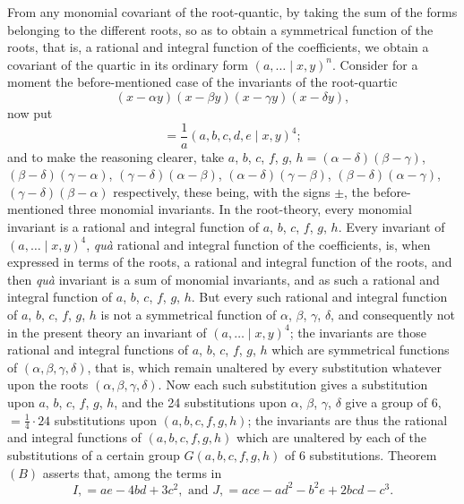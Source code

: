 \documentclass[11pt,a4paper]{book}
\begin{document}
From any monomial covariant of the root-quantic, by taking the sum of the forms belonging to the different roots, so as to obtain a symmetrical function of the roots, that is, a rational and integral function of the coefficients, we obtain a covariant of the quartic in its ordinary form $(a, \ldots \mid x, y)^n$. Consider for a moment the before-mentioned case of the invariants of the root-quartic
\[
(x - \alpha y)(x - \beta y)(x - \gamma y)(x - \delta y),
\]
now put
\[
= \frac{1}{a}(a, b, c, d, e \mid x, y)^4;
\]
and to make the reasoning clearer, take $a$, $b$, $c$, $f$, $g$, $h = (\alpha - \delta)(\beta - \gamma)$, $(\beta - \delta)(\gamma - \alpha)$, $(\gamma - \delta)(\alpha - \beta)$, $(\alpha - \delta)(\gamma - \beta)$, $(\beta - \delta)(\alpha - \gamma)$, $(\gamma - \delta)(\beta - \alpha)$ respectively, these being, with the signs $\pm$, the before-mentioned three monomial invariants. In the root-theory, every monomial invariant is a rational and integral function of $a$, $b$, $c$, $f$, $g$, $h$. Every invariant of $(a, \ldots \mid x, y)^4$, \textit{qu\`{a}} rational and integral function of the coefficients, is, when expressed in terms of the roots, a rational and integral function of the roots, and then \textit{qu\`{a}} invariant is a sum of monomial invariants, and as such a rational and integral function of $a$, $b$, $c$, $f$, $g$, $h$. But every such rational and integral function of $a$, $b$, $c$, $f$, $g$, $h$ is not a symmetrical function of $\alpha$, $\beta$, $\gamma$, $\delta$, and consequently not in the present theory an invariant of $(a, \ldots \mid x, y)^4$; the invariants are those rational and integral functions of $a$, $b$, $c$, $f$, $g$, $h$ which are symmetrical functions of $(\alpha, \beta, \gamma, \delta)$, that is, which remain unaltered by every substitution whatever upon the roots $(\alpha, \beta, \gamma, \delta)$. Now each such substitution gives a substitution upon $a$, $b$, $c$, $f$, $g$, $h$, and the 24 substitutions upon $\alpha$, $\beta$, $\gamma$, $\delta$ give a group of $6$, $= \frac{1}{4} \cdot 24$ substitutions upon $(a, b, c, f, g, h)$; the invariants are thus the rational and integral functions of $(a, b, c, f, g, h)$ which are unaltered by each of the substitutions of a certain group $G(a, b, c, f, g, h)$ of 6 substitutions. Theorem $(B)$ asserts that, among the terms in
\[
I, = ae - 4bd + 3c^2, \text{ and } J, = ace - ad^2 - b^2e + 2bcd - c^3.
\]
\end{document}
